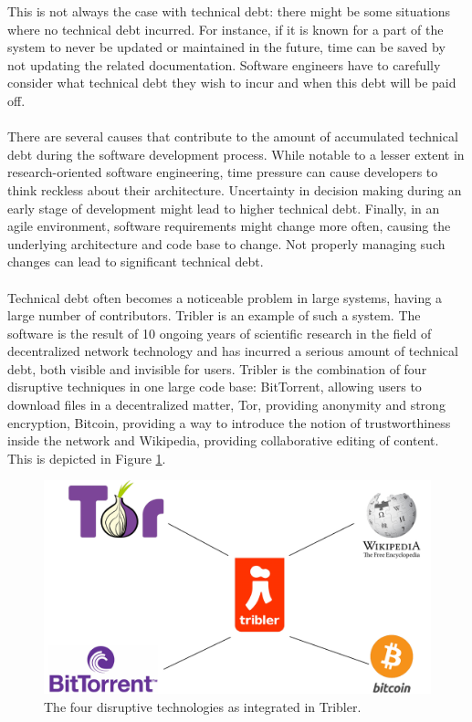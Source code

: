 This is not always the case with technical debt: there might be some situations where no technical debt incurred.
For instance, if it is known for a part of the system to never be updated or maintained in the future, time can be saved by not updating the related documentation.
Software engineers have to carefully consider what technical debt they wish to incur and when this debt will be paid off.\\\\
There are several causes that contribute to the amount of accumulated technical debt during the software development process\cite{martini2014architecture}. While notable to a lesser extent in research-oriented software engineering, time pressure can cause developers to think reckless about their architecture. Uncertainty in  decision making during an early stage of development might lead to higher technical debt. Finally, in an agile environment, software requirements might change more often, causing the underlying architecture and code base to change. Not properly managing such changes can lead to significant technical debt.\\\\
Technical debt often becomes a noticeable problem in large systems, having a large number of contributors. Tribler is an example of such a system. The software is the result of 10 ongoing years of scientific research in the field of decentralized network technology and has incurred a serious amount of technical debt, both visible and invisible for users.
Tribler is the combination of four disruptive techniques in one large code base: BitTorrent, allowing users to download files in a decentralized matter, Tor, providing anonymity and strong encryption, Bitcoin, providing a way to introduce the notion of trustworthiness inside the network and Wikipedia, providing collaborative editing of content. This is depicted in Figure \ref{fig:tribler-connections}.\\

\begin{figure}[!h]
	\centering
	\includegraphics[width=0.6\columnwidth]{images/introduction/tribler_connections}
	\caption{The four disruptive technologies as integrated in Tribler.}
	\label{fig:tribler-connections}
\end{figure}


